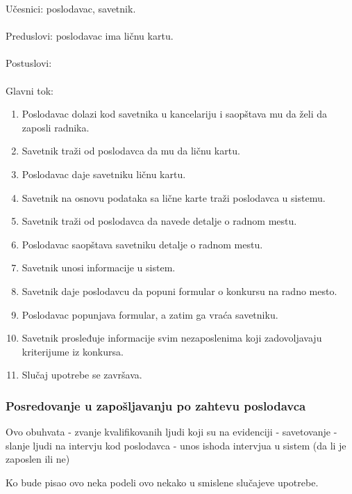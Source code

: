 \noindent Učesnici: poslodavac, savetnik.
\\
\\ Preduslovi: poslodavac ima ličnu kartu.
\\
\\ Postuslovi: 
\\
\\ Glavni tok:
\begin{enumerate}
\item Poslodavac dolazi kod savetnika u kancelariju i saopštava mu da želi da zaposli radnika.
\item Savetnik traži od poslodavca da mu da ličnu kartu.
\item Poslodavac daje savetniku ličnu kartu.
\item Savetnik na osnovu podataka sa lične karte traži poslodavca u sistemu.
\item Savetnik traži od poslodavca da navede detalje o radnom mestu.
\item Poslodavac saopštava savetniku detalje o radnom mestu.
\item Savetnik unosi informacije u sistem.
\item Savetnik daje poslodavcu da popuni formular o konkursu na radno mesto.
\item Poslodavac popunjava formular, a zatim ga vraća savetniku.
\item Savetnik prosleđuje informacije svim nezaposlenima koji zadovoljavaju kriterijume iz konkursa.
\item Slučaj upotrebe se završava.
\end{enumerate}

\subsubsection{Posredovanje u zapo\v sljavanju po zahtevu poslodavca}
Ovo obuhvata 
	- zvanje kvalifikovanih ljudi koji su na evidenciji
	- savetovanje 
	- slanje ljudi na intervju kod poslodavca
	- unos ishoda intervjua u sistem (da li je zaposlen ili ne)
	
Ko bude pisao ovo neka podeli ovo nekako u smislene  slu\v cajeve upotrebe.
